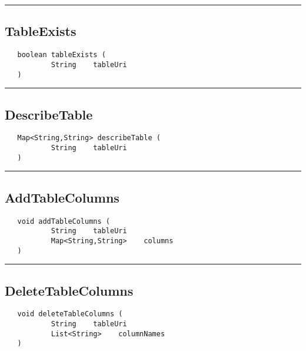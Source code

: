 \rule{15cm}{2pt}
\subsection{TableExists}
\label{Api:TableExists}
\begin{verbatim}
   boolean tableExists (
           String    tableUri
   )
\end{verbatim}



\rule{15cm}{2pt}
\subsection{DescribeTable}
\label{Api:DescribeTable}
\begin{verbatim}
   Map<String,String> describeTable (
           String    tableUri
   )
\end{verbatim}



\rule{15cm}{2pt}
\subsection{AddTableColumns}
\label{Api:AddTableColumns}
\begin{verbatim}
   void addTableColumns (
           String    tableUri
           Map<String,String>    columns
   )
\end{verbatim}



\rule{15cm}{2pt}
\subsection{DeleteTableColumns}
\label{Api:DeleteTableColumns}
\begin{verbatim}
   void deleteTableColumns (
           String    tableUri
           List<String>    columnNames
   )
\end{verbatim}



